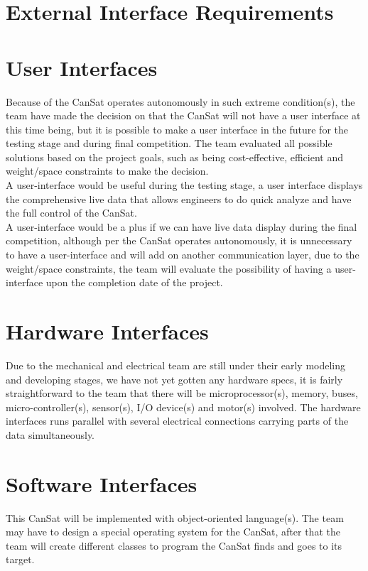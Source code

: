 \documentclass[10pt,onecolumn,draftclsnofoot,document]{IEEEtran}
\begin{document}
\section{External Interface Requirements}

\section{User Interfaces}
Because of the CanSat operates autonomously in such extreme condition(s), the team have made the decision on that the CanSat will not have a user interface at this time being, but it is possible to make a user interface in the future for the testing stage and during final competition. The team evaluated all possible solutions based on the project goals, such as being cost-effective, efficient and weight/space constraints to make the decision.\\
A user-interface would be useful during the testing stage, a user interface displays the comprehensive live data that allows engineers to do quick analyze and have the full control of the CanSat. \\
A user-interface would be a plus if we can have live data display during the final competition, although per the CanSat operates autonomously, it is unnecessary to have a user-interface and will add on another communication layer, due to the weight/space constraints, the team will evaluate the possibility of having a user-interface upon the completion date of the project.

\section{Hardware Interfaces}
Due to the mechanical and electrical team are still under their early modeling and developing stages, we have not yet gotten any hardware specs, it is fairly straightforward to the team that there will be microprocessor(s), memory, buses, micro-controller(s), sensor(s), I/O device(s) and motor(s) involved. The hardware interfaces runs parallel with several electrical connections carrying parts of the data simultaneously.

\section{Software Interfaces}
This CanSat will be implemented with object-oriented language(s). The team may have to design a special operating system for the CanSat, after that the team will create different classes to program the CanSat finds and goes to its target.
\end{document}
